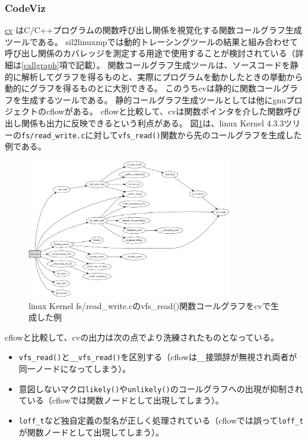 \subsubsection{CodeViz}
\label{cv}
\href{http://www.csn.ul.ie/~mel/projects/codeviz/}{\acrshort{cv}} \cite{cv}はC/C++プログラムの関数呼び出し関係を視覚化する関数コールグラフ生成ツールである。
\acrshort{sil2linuxmp}では動的トレーシングツールの結果と組み合わせて呼び出し関係のカバレッジを測定する用途で使用することが検討されている（詳細は\ref{callgraph}項で記載）。
関数コールグラフ生成ツールは、ソースコードを静的に解析してグラフを得るものと、実際にプログラムを動かしたときの挙動から動的にグラフを得るものとに大別できる。
このうち\acrshort{cv}は静的に関数コールグラフを生成するツールである。
静的コールグラフ生成ツールとしては他に\acrshort{gnu}プロジェクトの\acrshort{cflow}がある。
\acrshort{cflow}と比較して、\acrshort{cv}は関数ポインタを介した関数呼び出し関係も出力に反映できるという利点がある。
図\ref{vfs}は、\acrshort{linux} Kernel 4.3.3ツリーの\verb|fs/read_write.c|に対して\verb|vfs_read()|関数から先のコールグラフを生成した例である。
\begin{figure}[ht]
  \centering
  \includegraphics[width=0.8\textwidth]{pic/vfs_read.eps}
  \caption{\acrshort{linux} Kernel fs/read\_write.cのvfs\_read()関数コールグラフを\acrshort{cv}で生成した例}
  \label{vfs}
\end{figure}
\par
\acrshort{cflow}と比較して、\acrshort{cv}の出力は次の点でより洗練されたものとなっている。
\begin{itemize}
  \label{cv_vs_cflow}
  \item \verb|vfs_read()|と\verb|__vfs_read()|を区別する（\acrshort{cflow}は\verb|__|接頭辞が無視され両者が同一ノードになってしまう）。
  \item 意図しないマクロ\verb|likely()|や\verb|unlikely()|のコールグラフへの出現が抑制されている（\acrshort{cflow}では関数ノードとして出現してしまう）。
  \item \verb|loff_t|など独自定義の型名が正しく処理されている（\acrshort{cflow}では誤って\verb|loff_t|が関数ノードとして出現してしまう）。
\end{itemize}

